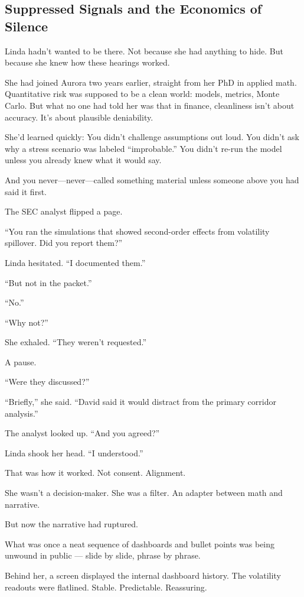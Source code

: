 \medskip

\subsection{Suppressed Signals and the Economics of Silence}

Linda hadn’t wanted to be there.
Not because she had anything to hide.
But because she knew how these hearings worked.

She had joined Aurora two years earlier, straight from her PhD in applied math.
Quantitative risk was supposed to be a clean world: models, metrics, Monte Carlo.
But what no one had told her was that in finance, cleanliness isn’t about accuracy.
It’s about plausible deniability.

She’d learned quickly:
You didn’t challenge assumptions out loud.
You didn’t ask why a stress scenario was labeled “improbable.”
You didn’t re-run the model unless you already knew what it would say.

And you never—never—called something material unless someone above you had said it first.

The SEC analyst flipped a page.

“You ran the simulations that showed second-order effects from volatility spillover. Did you report them?”

Linda hesitated.
“I documented them.”

“But not in the packet.”

“No.”

“Why not?”

She exhaled.
“They weren’t requested.”

A pause.

“Were they discussed?”

“Briefly,” she said. “David said it would distract from the primary corridor analysis.”

The analyst looked up. “And you agreed?”

Linda shook her head.
“I understood.”

That was how it worked.
Not consent. Alignment.

She wasn’t a decision-maker.
She was a filter.
An adapter between math and narrative.

But now the narrative had ruptured.

What was once a neat sequence of dashboards and bullet points was being unwound in public — slide by slide, phrase by phrase.

Behind her, a screen displayed the internal dashboard history.
The volatility readouts were flatlined.
Stable. Predictable.
Reassuring.

